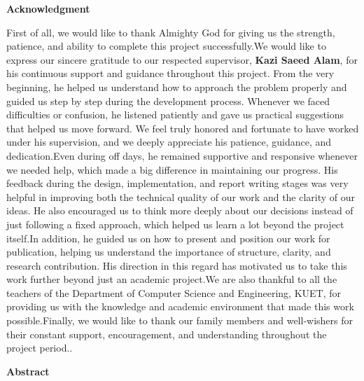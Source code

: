 \documentclass[12pt,a4paper]{report}
\begin{document}

\clearpage
{}

\vspace*{\fill}
\begin{center}
{\Large\bfseries Acknowledgment}
\end{center}

First of all, we would like to thank Almighty God for giving us the strength, patience, and ability to complete this project successfully.We would like to express our sincere gratitude to our respected supervisor, \textbf{Kazi Saeed Alam}, for his continuous support and guidance throughout this project. From the very beginning, he helped us understand how to approach the problem properly and guided us step by step during the development process. Whenever we faced difficulties or confusion, he listened patiently and gave us practical suggestions that helped us move forward. We feel truly honored and fortunate to have worked under his supervision, and we deeply appreciate his patience, guidance, and dedication.Even during off days, he remained supportive and responsive whenever we needed help, which made a big difference in maintaining our progress. His feedback during the design, implementation, and report writing stages was very helpful in improving both the technical quality of our work and the clarity of our ideas. He also encouraged us to think more deeply about our decisions instead of just following a fixed approach, which helped us learn a lot beyond the project itself.In addition, he guided us on how to present and position our work for publication, helping us understand the importance of structure, clarity, and research contribution. His direction in this regard has motivated us to take this work further beyond just an academic project.We are also thankful to all the teachers of the Department of Computer Science and Engineering, KUET, for providing us with the knowledge and academic environment that made this work possible.Finally, we would like to thank our family members and well-wishers for their constant support, encouragement, and understanding throughout the project period..

\vspace*{\fill}

\clearpage

\begin{center}
{\Large\bfseries Abstract}
\end{center}

\end{document}
